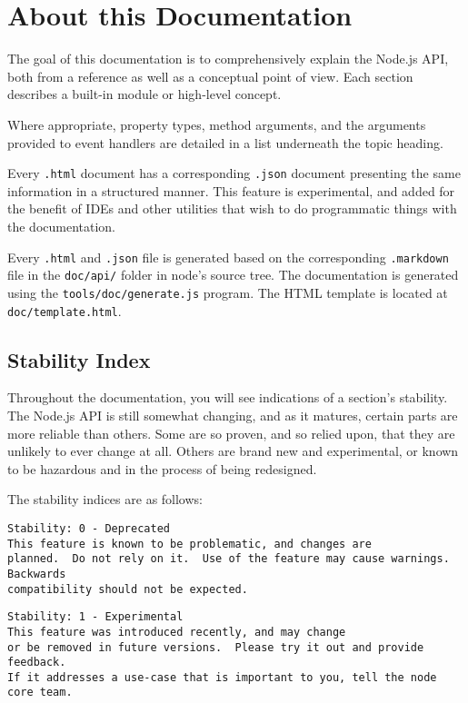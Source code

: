 \section{About this Documentation}\label{about-this-documentation}

The goal of this documentation is to comprehensively explain the Node.js
API, both from a reference as well as a conceptual point of view. Each
section describes a built-in module or high-level concept.

Where appropriate, property types, method arguments, and the arguments
provided to event handlers are detailed in a list underneath the topic
heading.

Every \texttt{.html} document has a corresponding \texttt{.json}
document presenting the same information in a structured manner. This
feature is experimental, and added for the benefit of IDEs and other
utilities that wish to do programmatic things with the documentation.

Every \texttt{.html} and \texttt{.json} file is generated based on the
corresponding \texttt{.markdown} file in the \texttt{doc/api/} folder in
node's source tree. The documentation is generated using the
\texttt{tools/doc/generate.js} program. The HTML template is located at
\texttt{doc/template.html}.

\subsection{Stability Index}\label{stability-index}

Throughout the documentation, you will see indications of a section's
stability. The Node.js API is still somewhat changing, and as it
matures, certain parts are more reliable than others. Some are so
proven, and so relied upon, that they are unlikely to ever change at
all. Others are brand new and experimental, or known to be hazardous and
in the process of being redesigned.

The stability indices are as follows:

\begin{verbatim}
Stability: 0 - Deprecated
This feature is known to be problematic, and changes are
planned.  Do not rely on it.  Use of the feature may cause warnings.  Backwards
compatibility should not be expected.
\end{verbatim}

\begin{verbatim}
Stability: 1 - Experimental
This feature was introduced recently, and may change
or be removed in future versions.  Please try it out and provide feedback.
If it addresses a use-case that is important to you, tell the node core team.
\end{verbatim}


